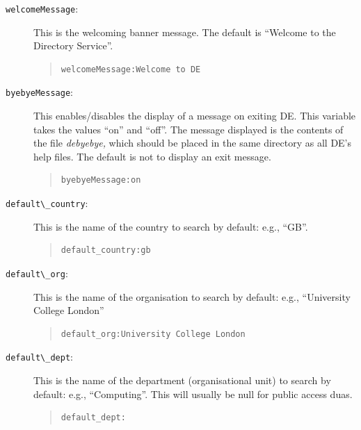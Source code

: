 \begin{description}

\item [\verb+welcomeMessage+:]  This is the welcoming banner message.  The 
default is ``Welcome to the Directory Service''.

\begin{quote}\small\begin{verbatim}
welcomeMessage:Welcome to DE
\end{verbatim}\end{quote}

\item [\verb+byebyeMessage+:]  This enables/disables the display of a 
message on
exiting DE.  This variable takes the values ``on'' and ``off''.  The 
message displayed is the contents of the file 
{\em debyebye,} which should be placed in the same directory as all
DE's help files.  The default is not to display an exit message.
 
\begin{quote}\small\begin{verbatim}
byebyeMessage:on
\end{verbatim}\end{quote}
  
\item [\verb+default\_country+:]  This is the name of the country to search by
default: e.g., ``GB''.

\begin{quote}\small\begin{verbatim}
default_country:gb
\end{verbatim}\end{quote}

\item [\verb+default\_org+:]  This is the name of the organisation to search by
default: e.g., ``University College London''

\begin{quote}\small\begin{verbatim}
default_org:University College London
\end{verbatim}\end{quote}

\item [\verb+default\_dept+:] This is the name of the department 
(organisational unit) to search by default: e.g., ``Computing''.  This will 
usually be null for public access duas.

\begin{quote}\small\begin{verbatim}
default_dept:
\end{verbatim}\end{quote}

\end{description}

